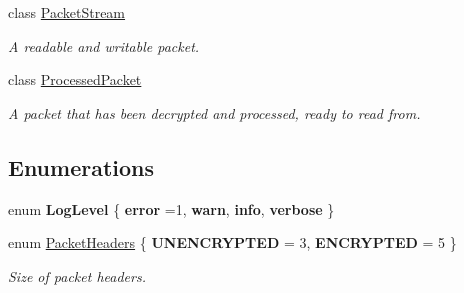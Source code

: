 \begin{DoxyCompactItemize}
class \hyperlink{class_gonzo_net_1_1_packet_stream}{Packet\+Stream}
\begin{DoxyCompactList}\small\item\em A readable and writable packet. \end{DoxyCompactList}\item 
class \hyperlink{class_gonzo_net_1_1_processed_packet}{Processed\+Packet}
\begin{DoxyCompactList}\small\item\em A packet that has been decrypted and processed, ready to read from. \end{DoxyCompactList}\end{DoxyCompactItemize}
\subsection*{Enumerations}
\begin{DoxyCompactItemize}
\item 
\hypertarget{namespace_gonzo_net_aca623900c53e0752f28264606fdcecef}{enum {\bfseries Log\+Level} \{ {\bfseries error} =1, 
{\bfseries warn}, 
{\bfseries info}, 
{\bfseries verbose}
 \}}\label{namespace_gonzo_net_aca623900c53e0752f28264606fdcecef}

\item 
enum \hyperlink{namespace_gonzo_net_a1a393df901137d5abf40b58a37edf1d6}{Packet\+Headers} \{ {\bfseries U\+N\+E\+N\+C\+R\+Y\+P\+T\+E\+D} = 3, 
{\bfseries E\+N\+C\+R\+Y\+P\+T\+E\+D} = 5
 \}
\begin{DoxyCompactList}\small\item\em Size of packet headers. \end{DoxyCompactList}\end{DoxyCompactItemize}
